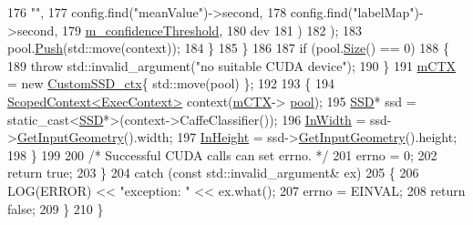 \begin{DoxyCode}
176                                 \textcolor{stringliteral}{""},
177                                 config.find(\textcolor{stringliteral}{"meanValue"})->second,
178                                 config.find(\textcolor{stringliteral}{"labelMap"})->second,
179                                 \mbox{\hyperlink{class_s_s_d_custom_net_detector_aa35b98cccf01cd5e9843a1e0c281a03d}{m\_confidenceThreshold}},
180                                 dev
181                         )
182                 );
183                 pool.\mbox{\hyperlink{class_queue_ace62235edaffc6f375d040c32c0ab651}{Push}}(std::move(context));
184             \}
185         \}
186 
187         \textcolor{keywordflow}{if} (pool.\mbox{\hyperlink{class_queue_a5e59f2b97d5dea8ad0314b6239816055}{Size}}() == 0)
188         \{
189             \textcolor{keywordflow}{throw} std::invalid\_argument(\textcolor{stringliteral}{"no suitable CUDA device"});
190         \}
191         \mbox{\hyperlink{class_s_s_d_custom_net_detector_ad0d9609d8e5b22e28cae854f0ac06058}{mCTX}} = \textcolor{keyword}{new} \mbox{\hyperlink{struct_custom_s_s_d__ctx}{CustomSSD\_ctx}}\{ std::move(pool) \};
192 
193         \{
194             \mbox{\hyperlink{class_scoped_context}{ScopedContext<ExecContext>}} context(\mbox{\hyperlink{class_s_s_d_custom_net_detector_ad0d9609d8e5b22e28cae854f0ac06058}{mCTX}}->
      \mbox{\hyperlink{struct_custom_s_s_d__ctx_a2259ed0cb6edcac14eddb309d061c7f3}{pool}});
195             \mbox{\hyperlink{class_s_s_d}{SSD}}* ssd = \textcolor{keyword}{static\_cast<}\mbox{\hyperlink{class_s_s_d}{SSD}}*\textcolor{keyword}{>}(context->CaffeClassifier());
196             \mbox{\hyperlink{class_s_s_d_custom_net_detector_aa40596238aee8ed737f132d5f842d65d}{InWidth}} = ssd->\mbox{\hyperlink{class_s_s_d_a20f17f5f9dbdc816f7b3ae4e30428427}{GetInputGeometry}}().width;
197             \mbox{\hyperlink{class_s_s_d_custom_net_detector_ad1f675644d34cba9e15b9ae47a51bd53}{InHeight}} = ssd->\mbox{\hyperlink{class_s_s_d_a20f17f5f9dbdc816f7b3ae4e30428427}{GetInputGeometry}}().height;
198         \}
199 
200         \textcolor{comment}{/* Successful CUDA calls can set errno. */}
201         errno = 0;
202         \textcolor{keywordflow}{return} \textcolor{keyword}{true};
203     \}
204     \textcolor{keywordflow}{catch} (\textcolor{keyword}{const} std::invalid\_argument& ex)
205     \{
206         LOG(ERROR) << \textcolor{stringliteral}{"exception: "} << ex.what();
207         errno = EINVAL;
208         \textcolor{keywordflow}{return} \textcolor{keyword}{false};
209     \}
210 \}
\end{DoxyCode}
